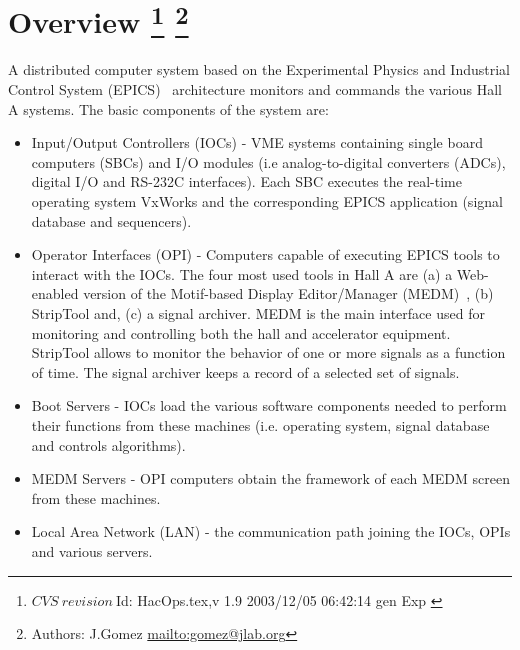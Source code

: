 \chapter[Overview]{Overview
\footnote{
  $CVS~revision~ $Id: HacOps.tex,v 1.9 2003/12/05 06:42:14 gen Exp $ $
}
\footnote{Authors: J.Gomez \url{mailto:gomez@jlab.org}}
}
\label{chap:controls}

A distributed computer system
based on the 
Experimental Physics and Industrial Control System 
(EPICS)~\cite{EPICSwww}
 architecture monitors and commands
the various Hall A systems. The basic components of the system are:
\begin{itemize}
\item Input/Output Controllers (IOCs) - VME systems containing single
board computers (SBCs) and I/O modules
(i.e analog-to-digital converters (ADCs), digital I/O and RS-232C interfaces).
Each SBC executes the real-time operating system VxWorks and the corresponding EPICS application (signal database
and sequencers).
\item Operator Interfaces (OPI) - Computers capable of executing
EPICS tools to interact with the IOCs.
The four most used tools in Hall A are (a)
a Web-enabled version of the Motif-based Display Editor/Manager (MEDM)~\cite{MEDMwww}, 
(b) StripTool and, (c) a signal archiver.
MEDM is the main interface used for monitoring and controlling both the hall and accelerator
equipment. StripTool allows to monitor 
the behavior of one or more signals as a function of time. 
The signal archiver keeps a record of a selected set of signals.
\item Boot Servers - IOCs load the various
software components needed to perform their functions from these machines (i.e. operating system,
signal database and controls algorithms).
\item MEDM Servers - OPI computers obtain the framework of each MEDM screen from these machines.
\item Local Area Network (LAN) - the communication path joining the IOCs, OPIs and various servers.
\end{itemize}

